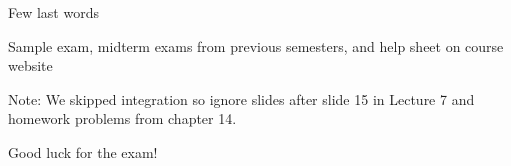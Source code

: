\documentclass{./../../Latex/teaching_slides}
\begin{document}
%
%    


\begin{frame}{Few last words}
\begin{witemize}
\item Sample exam, midterm exams from previous semesters, and help sheet on course website
\item Note: We skipped integration so ignore slides after slide 15 in Lecture 7 and homework problems from chapter 14.
  \item Good luck for the exam!
\end{witemize}
\end{frame}
\end{document}
